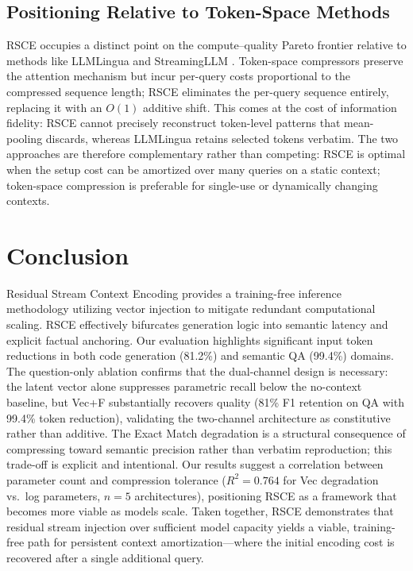 \documentclass[11pt]{article}
\begin{document}
\subsection{Positioning Relative to Token-Space Methods}
RSCE occupies a distinct point on the compute--quality Pareto frontier relative to methods like LLMLingua \cite{jiang2023llmlingua} and StreamingLLM \cite{xiao2023streamingllm}. Token-space compressors preserve the attention mechanism but incur per-query costs proportional to the compressed sequence length; RSCE eliminates the per-query sequence entirely, replacing it with an $O(1)$ additive shift. This comes at the cost of information fidelity: RSCE cannot precisely reconstruct token-level patterns that mean-pooling discards, whereas LLMLingua retains selected tokens verbatim. The two approaches are therefore complementary rather than competing: RSCE is optimal when the setup cost can be amortized over many queries on a static context; token-space compression is preferable for single-use or dynamically changing contexts.

\section{Conclusion}
\label{sec:conclusion}

Residual Stream Context Encoding provides a training-free inference methodology utilizing vector injection to mitigate redundant computational scaling. RSCE effectively bifurcates generation logic into semantic latency and explicit factual anchoring. Our evaluation highlights significant input token reductions in both code generation (81.2\%) and semantic QA (99.4\%) domains. The question-only ablation confirms that the dual-channel design is necessary: the latent vector alone suppresses parametric recall below the no-context baseline, but Vec+F substantially recovers quality (81\% F1 retention on QA with 99.4\% token reduction), validating the two-channel architecture as constitutive rather than additive. The Exact Match degradation is a structural consequence of compressing toward semantic precision rather than verbatim reproduction; this trade-off is explicit and intentional. Our results suggest a correlation between parameter count and compression tolerance ($R^2 = 0.764$ for Vec degradation vs.\ log parameters, $n = 5$ architectures), positioning RSCE as a framework that becomes more viable as models scale. Taken together, RSCE demonstrates that residual stream injection over sufficient model capacity yields a viable, training-free path for persistent context amortization---where the initial encoding cost is recovered after a single additional query.
\end{document}
